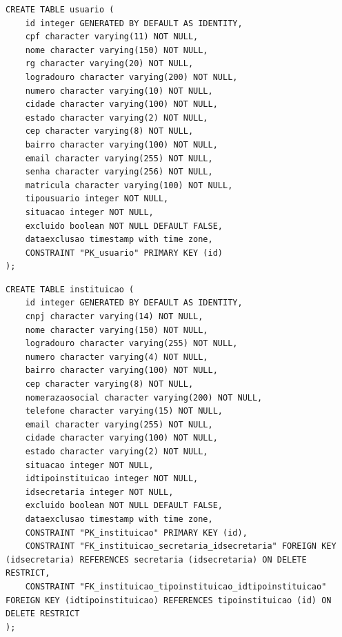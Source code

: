 \begin{quadro}[H]
\caption{Script SQL — Tabela usuario}
\label{qua:script-usuario}
\begin{minipage}{0.96\textwidth}
\begin{lstlisting}[style=academic-sql]
CREATE TABLE usuario (
    id integer GENERATED BY DEFAULT AS IDENTITY,
    cpf character varying(11) NOT NULL,
    nome character varying(150) NOT NULL,
    rg character varying(20) NOT NULL,
    logradouro character varying(200) NOT NULL,
    numero character varying(10) NOT NULL,
    cidade character varying(100) NOT NULL,
    estado character varying(2) NOT NULL,
    cep character varying(8) NOT NULL,
    bairro character varying(100) NOT NULL,
    email character varying(255) NOT NULL,
    senha character varying(256) NOT NULL,
    matricula character varying(100) NOT NULL,
    tipousuario integer NOT NULL,
    situacao integer NOT NULL,
    excluido boolean NOT NULL DEFAULT FALSE,
    dataexclusao timestamp with time zone,
    CONSTRAINT "PK_usuario" PRIMARY KEY (id)
);
\end{lstlisting}
\end{minipage}
\end{quadro}

\begin{quadro}[H]
\caption{Script SQL — Tabela instituicao}
\label{qua:script-instituicao}
\begin{minipage}{0.96\textwidth}
\begin{lstlisting}[style=academic-sql]
CREATE TABLE instituicao (
    id integer GENERATED BY DEFAULT AS IDENTITY,
    cnpj character varying(14) NOT NULL,
    nome character varying(150) NOT NULL,
    logradouro character varying(255) NOT NULL,
    numero character varying(4) NOT NULL,
    bairro character varying(100) NOT NULL,
    cep character varying(8) NOT NULL,
    nomerazaosocial character varying(200) NOT NULL,
    telefone character varying(15) NOT NULL,
    email character varying(255) NOT NULL,
    cidade character varying(100) NOT NULL,
    estado character varying(2) NOT NULL,
    situacao integer NOT NULL,
    idtipoinstituicao integer NOT NULL,
    idsecretaria integer NOT NULL,
    excluido boolean NOT NULL DEFAULT FALSE,
    dataexclusao timestamp with time zone,
    CONSTRAINT "PK_instituicao" PRIMARY KEY (id),
    CONSTRAINT "FK_instituicao_secretaria_idsecretaria" FOREIGN KEY (idsecretaria) REFERENCES secretaria (idsecretaria) ON DELETE RESTRICT,
    CONSTRAINT "FK_instituicao_tipoinstituicao_idtipoinstituicao" FOREIGN KEY (idtipoinstituicao) REFERENCES tipoinstituicao (id) ON DELETE RESTRICT
);
\end{lstlisting}
\end{minipage}
\end{quadro}

